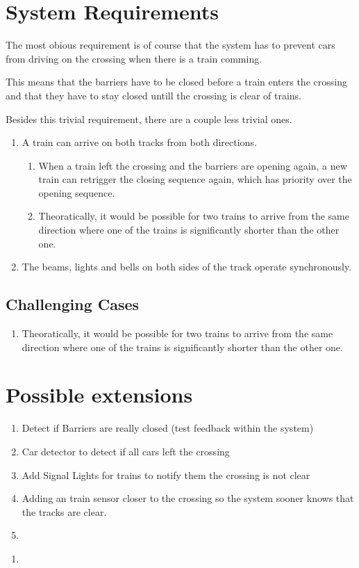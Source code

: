 \documentclass[final]{report} %
\begin{document}
\section{System Requirements}
The most obious requirement is of course that the system has to prevent cars from driving on the crossing when there is a train comming.

This means that the barriers have to be closed before a train enters the crossing and that they have to stay closed untill the crossing is clear of trains.

Besides this trivial requirement, there are a couple less trivial ones.
\begin{enumerate}
\item A train can arrive on both tracks from both directions.
	\begin{enumerate}
	\item When a train left the crossing and the barriers are opening again, a new train can retrigger the closing sequence again, which has priority over the opening sequence. %
	\item Theoratically, it would be possible for two trains to arrive from the same direction where one of the trains is significantly shorter than the other one. %
	\end{enumerate}

\item The beams, lights and bells on both sides of the track operate synchronously.
\end{enumerate}







\subsection{Challenging Cases}
	\begin{enumerate}
		\item Theoratically, it would be possible for two trains to arrive from the same direction where one of the trains is significantly shorter than the other one.

	\end{enumerate}

\section{Possible extensions}
\begin{enumerate}
\item Detect if Barriers are really closed (test feedback within the system)
\item Car detector to detect if all cars left the crossing
\item Add Signal Lights for trains to notify them the crossing is not clear
\item Adding an train sensor closer to the crossing so the system sooner knows that the tracks are clear.
\item 
\end{enumerate}



\begin{enumerate}
\item 
\end{enumerate}
\end{document}
